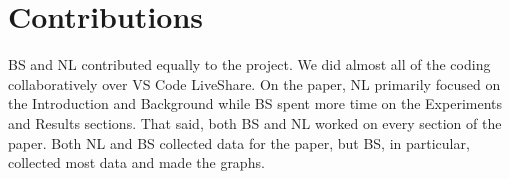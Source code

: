 
\section{Contributions}
\label{sec:contrib}
BS and NL contributed equally to the project. We did almost all of the coding collaboratively over VS Code LiveShare. On the paper, NL primarily focused on the Introduction and Background while BS spent more time on the Experiments and Results sections. That said, both BS and NL worked on every section of the paper. Both NL and BS collected data for the paper, but BS, in particular, collected most data and made the graphs. 


